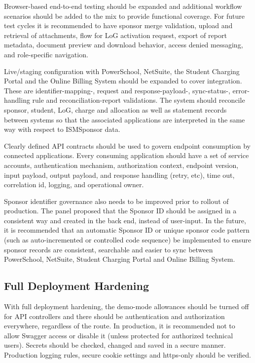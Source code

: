 Browser-based end-to-end testing should be expanded and additional workflow scenarios should be added to the mix to provide functional coverage. For future test cycles it is recommended to have sponsor merge validation, upload and retrieval of attachments, flow for LoG activation request, export of report metadata, document preview and download behavior, access denied messaging, and role-specific navigation.

Live/staging configuration with PowerSchool, NetSuite, the Student Charging Portal and the Online Billing System should be expanded to cover integration. These are identifier-mapping-, request and response-payload-, sync-status-, error-handling rule and reconciliation-report validations. The system should reconcile sponsor, student, LoG, charge and allocation as well as statement records between systems so that the associated applications are interpreted in the same way with respect to ISMSponsor data.

Clearly defined API contracts should be used to govern endpoint consumption by connected applications. Every consuming application should have a set of service accounts, authentication mechanism, authorization context, endpoint version, input payload, output payload, and response handling (retry, etc), time out, correlation id, logging, and operational owner.

Sponsor identifier governance also needs to be improved prior to rollout of production. The panel proposed that the Sponsor ID should be assigned in a consistent way and created in the back end, instead of user-input. In the future, it is recommended that an automatic Sponsor ID or unique sponsor code pattern (such as auto-incremented or controlled code sequence) be implemented to ensure sponsor records are consistent, searchable and easier to sync between PowerSchool, NetSuite, Student Charging Portal and Online Billing System.

\subsection{Full Deployment Hardening}

With full deployment hardening, the demo-mode allowances should be turned off for API controllers and there should be authentication and authorization everywhere, regardless of the route. In production, it is recommended not to allow Swagger access or disable it (unless protected for authorized technical users). Secrets should be checked, changed and saved in a secure manner. Production logging rules, secure cookie settings and https-only should be verified.

